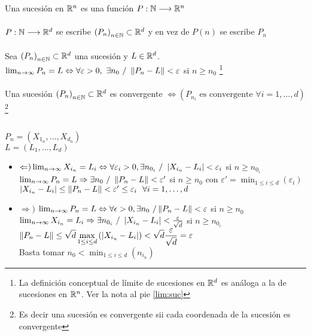 \documentclass[a4paper,10pt]{article}
\begin{document}
\fi
\hspace*{\fill} \\
\hspace*{\fill} \\
 Una sucesión en $\rene$ es una función $P: \mathbb{N} \longrightarrow \rene$
\\ \\
\notacion $P: \mathbb{N} \longrightarrow \rene[d]$ se escribe $\defsucesion{P} \subset \rene[d]$ y en vez de $P(n)$ se escribe $P_n$
\\ \\
 Sea $\defsucesion{P} \subset \rene[d]$ una sucesión y $L \in \rene[d]$. \\
$\lim_{n \to \infty} P_n = L \Leftrightarrow \forall \varepsilon > 0, \ \exists n_0 \ / \ \norm{P_n-L} < \varepsilon$ si $n \geq n_0$
\hspace{1em}
\footnote{La definición conceptual de límite de sucesiones en $\rene[d]$ es análoga a la de sucesiones en $\rene$. Ver la nota al pie \ref{lim:suc} }
\\ \\
\teorema Una sucesión $\defsucesion{P} \subset \rene[d]$ es convergente $\Leftrightarrow \left( P_{n_i} \mbox{ es convergente } \forall i = 1,\dots,d \right)$ \footnote{Es decir una sucesión es convergente sii cada coordenada de la sucesión es convergente}
\ifversionlarga
\\
\begin{demo}
	\\
	$P_n = (X_{1_n},\dots,X_{d_n})$ \\
	\indent $L = (L_1,\dots,L_d)$
	\begin{itemize}
		\item $\Leftarrow) \lim_{n \to \infty} X_{i_n} = L_i \Leftrightarrow \forall \varepsilon_i > 0, \exists n_{0_i} \ / \ \abs{X_{i_n}-L_i} < \varepsilon_i$ si $n \geq n_{0_i}$ \\
		$\lim_{n \to \infty} P_n = L \Rightarrow \exists n_0 \ / \ \norm{P_n - L} < \varepsilon'$ si $n \geq n_0$ con $\displaystyle\varepsilon'=\min_{1 \leq i \leq d} \left( {\varepsilon_i} \right)$ \\
		$\abs{X_{i_n}-L_i} \leq \norm{P_n-L} < \varepsilon' \leq \varepsilon_i \ \ \forall i=1,\dots,d$
		\item $\Rightarrow)$ $\lim_{n \to \infty} P_{n} = L \Leftrightarrow \forall \epsilon > 0, \exists n_0 \ / \norm{P_n-L} < \varepsilon$ si $n \geq n_0$ \\
		$\lim_{n \to \infty} X_{i_n} = L_i \Rightarrow \exists n_{0_i} \ / \ \abs{X_{i_n}-L_i} < \frac{\varepsilon}{\sqrt{d}}$ si $n \geq n_{0_i}$ \\
		$\displaystyle\norm{P_n - L} \leq \sqrt{d} \max_{1 \leq i \leq d} \left( \abs{X_{i_n}-L_i} \right) < \sqrt{d} \frac{\varepsilon}{\sqrt{d}} = \varepsilon$ \\
		Basta tomar $\displaystyle n_0 < \min_{1 \leq i \leq d} \left( n_{i_n} \right)$
	\end{itemize} 
\end{demo}
\end{document}

